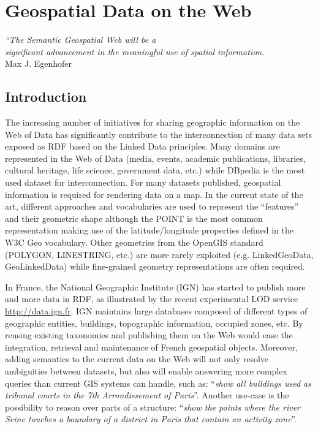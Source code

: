 \chapter{Geospatial Data on the Web}
\label{ch:ch1}

\begin{flushright}
\textit{``The Semantic Geospatial Web will be a \\ significant advancement in the 
 meaningful use of spatial information.}\cite{egenhofer12}\\
 Max J. Egenhofer 
 
\end{flushright}



 
\section*{Introduction}
The increasing number of initiatives for sharing geographic information on the Web of Data has significantly contribute to the interconnection of many data sets exposed as RDF based on the Linked Data principles. Many domains are represented in the Web of Data (media, events, academic publications, libraries, cultural heritage, life science, government data, etc.) while DBpedia is the most used dataset for interconnection. For many datasets published, geospatial information is required for rendering data on a map. In the current state of the art, different approaches and vocabularies are used to represent the ``features'' and their geometric shape although the POINT is the most common representation making use of the latitude/longitude properties defined in the W3C Geo vocabulary. Other geometries from the OpenGIS standard (POLYGON, LINESTRING, etc.) are more rarely exploited (e.g. LinkedGeoData, GeoLinkedData) while fine-grained geometry representations are often required.

In France, the National Geographic Institute (IGN) has started to publish more and more data in RDF, as illustrated by the recent experimental LOD service \url{http://data.ign.fr}. IGN maintains large databases composed of different types of geographic entities, buildings, topographic information, occupied zones, etc. By reusing existing taxonomies and publishing them on the Web would ease the integration, retrieval and maintenance of French geospatial objects. Moreover, adding semantics to the current data on the Web will not only resolve ambiguities between datasets, but also will enable answering more complex queries than current GIS systems can handle, such as: ``\emph{show all buildings used as tribunal courts in the 7th Arrondissement of Paris}''. Another use-case is the possibility to reason over parts of a structure: ``\emph{show the points where the river Seine touches a boundary of a district in Paris that contain an activity zone}''.

